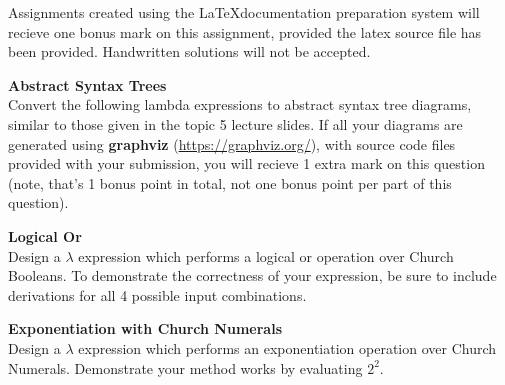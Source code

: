 \documentclass{exam}
\begin{document}
\begin{center}
\end{center}

Assignments created using the \LaTeX documentation preparation system will recieve one bonus mark on this assignment, provided the latex source file has been provided.  Handwritten solutions will not be accepted.  

\begin{questions}
\question \textbf{Abstract Syntax Trees} \\
Convert the following lambda expressions to abstract syntax tree diagrams, similar to those given in the topic 5 lecture slides.  If all your diagrams are generated using \textbf{graphviz} (\url{https://graphviz.org/}), with source code files provided with your submission, you will recieve 1 extra mark on this question (note, that's 1 bonus point in total, not one bonus point per part of this question).


\question[10] \textbf{Logical Or} \\ 
Design a $\lambda$ expression which performs a logical or operation over Church Booleans.  To demonstrate the correctness of your expression, be sure to include derivations for all 4 possible input combinations.  

\question[12] \textbf{Exponentiation with Church Numerals} \\
Design a $\lambda$ expression which performs an exponentiation operation over Church Numerals.  Demonstrate your method works by evaluating $2^2$.

\end{questions}
\end{document}
